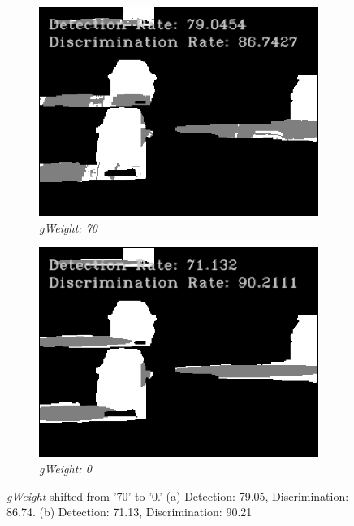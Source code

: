 \begin{figure}
  \centering
  \begin{subfigure}{.49\linewidth}
    \includegraphics[width=1\linewidth]{figures/background/geo_highway1_70.png}
    \caption{\textit{gWeight: 70}}
  \end{subfigure}
  \hfill
  \begin{subfigure}{.49\linewidth}
    \includegraphics[width=1\linewidth]{figures/background/geo_highway1_0.png}
    \caption{\textit{gWeight: 0}}
  \end{subfigure}
  \caption{\textit{gWeight} shifted from '70' to '0.' (a) Detection: 79.05, Discrimination: 86.74. (b) Detection: 71.13, Discrimination: 90.21}
  \label{fig:gweight}
\end{figure}

